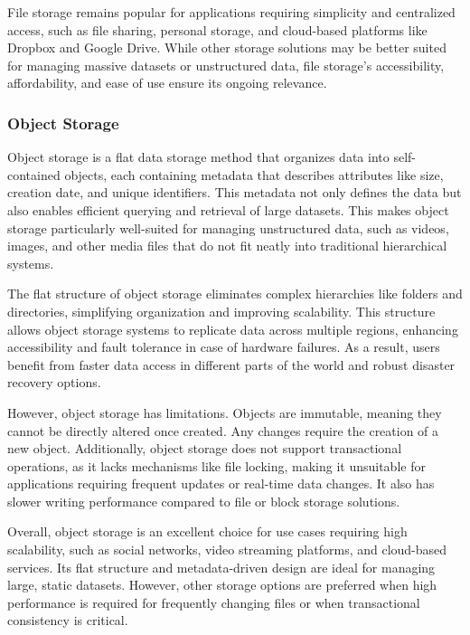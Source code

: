 File storage remains popular for applications requiring simplicity and centralized access, such as file sharing, personal storage, and cloud-based platforms like Dropbox and Google Drive. While other storage solutions may be better suited for managing massive datasets or unstructured data, file storage's accessibility, affordability, and ease of use ensure its ongoing relevance.

\subsubsection*{Object Storage}

Object storage is a flat data storage method that organizes data into self-contained objects, each containing metadata that describes attributes like size, creation date, and unique identifiers. This metadata not only defines the data but also enables efficient querying and retrieval of large datasets. This makes object storage particularly well-suited for managing unstructured data, such as videos, images, and other media files that do not fit neatly into traditional hierarchical systems.

The flat structure of object storage eliminates complex hierarchies like folders and directories, simplifying organization and improving scalability. This structure allows object storage systems to replicate data across multiple regions, enhancing accessibility and fault tolerance in case of hardware failures. As a result, users benefit from faster data access in different parts of the world and robust disaster recovery options.

However, object storage has limitations. Objects are immutable, meaning they cannot be directly altered once created. Any changes require the creation of a new object. Additionally, object storage does not support transactional operations, as it lacks mechanisms like file locking, making it unsuitable for applications requiring frequent updates or real-time data changes. It also has slower writing performance compared to file or block storage solutions.

Overall, object storage is an excellent choice for use cases requiring high scalability, such as social networks, video streaming platforms, and cloud-based services. Its flat structure and metadata-driven design are ideal for managing large, static datasets. However, other storage options are preferred when high performance is required for frequently changing files or when transactional consistency is critical.

